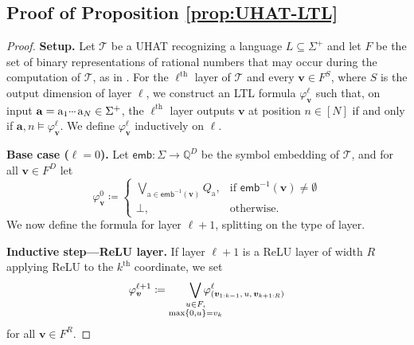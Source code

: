 \documentclass{article} %
\newcommand{\Q}{\mathbb{Q}}
\newcommand{\emb}{\mathsf{emb}}
\newcommand{\bnfdef}{\coloneqq}
\newcommand{\sym}[1]{\mathrm{#1}}
\newcommand{\str}[1]{#1}
\newcommand{\alphabet}{\Sigma}
\newcommand{\bv}{\boldsymbol{v}}
\newcommand{\bword}{\mathbf{a}}
\newcommand{\trans}{\mathcal{T}}
\newcommand{\Qprop}[1]{Q_{#1}}
\newcommand{\Lang}{L}
\newcommand{\kplus}{^+}
\newcommand{\mydots}{%
  \ifmmode
    \mathord{.}\mkern-1mu\mathord{.}\mkern-1mu\mathord{.}%
  \else
    .\kern-0.1em.\kern-0.1em.%
  \fi
}
\newcommand{\mycdots}{%
  \ifmmode
    \mathord{\raisebox{0.45ex}{\ensuremath{\mydots}}}\mkern2mu%
  \else
    \raisebox{0.45ex}{.\kern-0.1em.\kern-0.1em.}\kern0.1em%
  \fi
}
\renewcommand{\cdots}{\mycdots}%
\begin{document}
\subsection{Proof of Proposition \ref{prop:UHAT-LTL}}\label{app:UHAT-LTL}
\propUHATLTL*
\begin{proof}
\noindent\textbf{Setup.}\quad
Let $\trans$ be a UHAT recognizing a language $\Lang \subseteq \alphabet\kplus$ and let
$F$ be the set of binary representations of rational numbers that may occur during the computation of $\trans$, as in .
For the $\ell^{\text{th}}$ layer of $\trans$ and every $\bv \in F^S$,
where $S$ is the output dimension of layer $\ell$,
we construct an LTL formula $\varphi_{\bv}^\ell$ such that, on input $\str{\bword} = \sym{a}_1 \cdots \sym{a}_N \in \alphabet\kplus$,
the $\ell^{\text{th}}$ layer outputs $\bv$ at position $n \in [N]$ if and only if
$\str{\bword}, n \models \varphi_{\bv}^\ell$.
We define $\varphi_{\bv}^\ell$ inductively on $\ell$.

\medskip\noindent\textbf{Base case ($\ell = 0$).}\quad
Let $\emb \colon \alphabet \to \Q^D$ be the symbol embedding of $\trans$, and for all $\bv \in F^D$ let
\begin{equation}
\varphi_{\bv}^0 \bnfdef \begin{cases}
\displaystyle \bigvee_{\sym{a} \in \emb^{-1}(\bv)} \Qprop{\sym{a}}, &\text{if } \emb^{-1}(\bv) \ne \emptyset\\
\bot, &\text{otherwise.}
\end{cases}
\end{equation}
We now define the formula for layer $\ell+1$, splitting on the type of layer.

\medskip\noindent\textbf{Inductive step---ReLU layer.}\quad
If layer $\ell+1$ is a ReLU layer of width $R$ applying ReLU to the $k^{\text{th}}$ coordinate, we set
\begin{equation}
\varphi_{\bv}^{\ell+1} \bnfdef \smashoperator[r]{\bigvee_{\substack{u \in F, \\ \max\{0,u\} = v_k}}} \varphi_{(\bv_{1:k-1},\, u,\, \bv_{k+1:R})}^\ell
\end{equation}
for all $\bv \in F^R$.


\end{proof}
\end{document}
